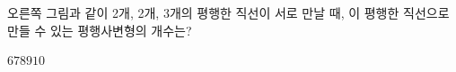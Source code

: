 \noindent\begin{minipage}[t]{0.58\linewidth}\vspace{0pt}\raggedright 오른쪽 그림과 같이 2개, 2개, 3개의 평행한 직선이 서로 만날 때, 이 평행한 직선으로 만들 수 있는 평행사변형의 개수는?\end{minipage}\hfill\begin{minipage}[t]{0.4\linewidth}\vspace{0pt}\centering \resizebox{\ifdim\width>\linewidth\linewidth\else\width\fi}{!}{}\end{minipage}\par
\begin{choicesii}{$6$}{$7$}{$8$}{$9$}{$10$}\end{choicesii}
